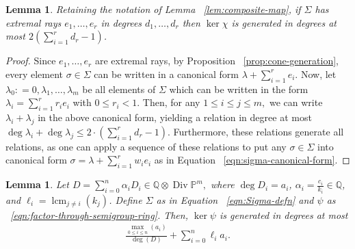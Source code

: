 \documentclass{amsart}
\theoremstyle{plain}
\newtheorem{lem}[thm]{Lemma}
\theoremstyle{definition}
\theoremstyle{remark}
\numberwithin{equation}{section}
\newcommand\bq{{\mathbb Q}}
\newcommand\bp{{\mathbb P}}
\DeclareMathOperator\di{Div}
\newcommand\bida{a}
\DeclareMathOperator{\lcm}{lcm}
\begin{document}
\begin{lem}
\label{lem:bound-ker-chi}
Retaining the notation of Lemma ~\ref{lem:composite-map}, if $\Sigma$ has
extremal rays $e_1,\ldots, e_r$ in degrees $d_1, \ldots, d_r$ then $\ker \chi$
is generated in degrees at most $2(\sum_{i=1}^{r}d_r-1)$.
\end{lem}
\begin{proof}
Since $e_1, \ldots, e_r$ are extremal rays, by Proposition
~\ref{prop:cone-generation}, every element $\sigma \in \Sigma$ can be written
in a canonical form $\lambda + \sum_{i=1}^{r}e_i$. Now, let $\lambda_0 \colon =
0,\lambda_1, \ldots, \lambda_m$ be all elements of $\Sigma$ which can be
written in the form $\lambda_i = \sum_{i=1}^{r}r_i e_i$ with $0 \leq r_i < 1.$
Then, for any $1 \leq i \leq j \leq m,$ we can write $\lambda_i + \lambda_j$ in
the above canonical form, yielding a relation in degree at most $\deg \lambda_i
+ \deg \lambda_j \leq 2 \cdot \left( \sum_{i=1}^{r}d_r -1 \right).$
Furthermore, these relations generate all relations, as one can apply a
sequence of these relations to put any $\sigma \in \Sigma$ into canonical form
$\sigma = \lambda + \sum_{i=1}^{r}w_i e_i$ as in Equation
~\eqref{eqn:sigma-canonical-form}.
\end{proof}
\begin{lem}
\label{lem:proj-relations-psi}
Let $D = \sum_{i=0}^{n} \alpha_i D_i \in \bq \otimes \di \bp^m,$ where
$\deg D_i = \bida_i$, $\alpha_i = \frac{c_i}{k_i}\in \bq$, and
$\ell_i = \lcm_{j \neq i} (k_j)$. Define $\Sigma$ as in Equation
~\eqref{eqn:Sigma-defn} and $\psi$ as ~\eqref{eqn:factor-through-semigroup-ring}. Then, $\ker \psi$ is generated in degrees at most
\begin{align}
\label{eqn:proj-relation-degree}
	\frac{\max_{0\le i \le n}(\bida_i)}{\deg(D)} +  \sum_{i=0}^n \ell_i a_i.
\end{align}

\end{lem}
\end{document}
